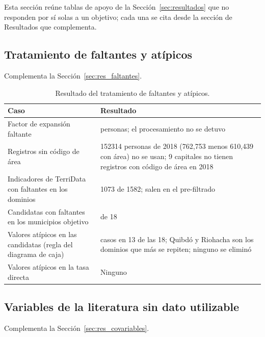 Esta sección reúne tablas de apoyo de la Sección~\ref{sec:resultados} que no responden por sí solas a un objetivo; cada una se cita desde la sección de Resultados que complementa.

\subsection{Tratamiento de faltantes y atípicos}

Complementa la Sección~\ref{sec:res_faltantes}.

\begin{table}[!htbp]
\centering
\small
\caption{Resultado del tratamiento de faltantes y atípicos.}
\label{tab:res_faltantes}
\begin{tabularx}{\linewidth}{>{\raggedright\arraybackslash}p{4.6cm} >{\raggedright\arraybackslash}X}
\toprule
Caso & Resultado \\
\midrule
Factor de expansión faltante & 0 personas; el procesamiento no se detuvo \\
Registros sin código de área & \num{152314} personas de 2018 (762,753 menos 610,439 con área) no se usan; 9 capitales no tienen registros con código de área en 2018 \\
Indicadores de TerriData con faltantes en los dominios & \num{1073} de \num{1582}; salen en el pre-filtrado \\
Candidatas con faltantes en los municipios objetivo & 0 de 18 \\
Valores atípicos en las candidatas (regla del diagrama de caja) & 22 casos en 13 de las 18; Quibdó y Riohacha son los dominios que más se repiten; ninguno se eliminó \\
Valores atípicos en la tasa directa & Ninguno \\
\bottomrule
\end{tabularx}
\end{table}

\subsection{Variables de la literatura sin dato utilizable}

Complementa la Sección~\ref{sec:res_covariables}.

